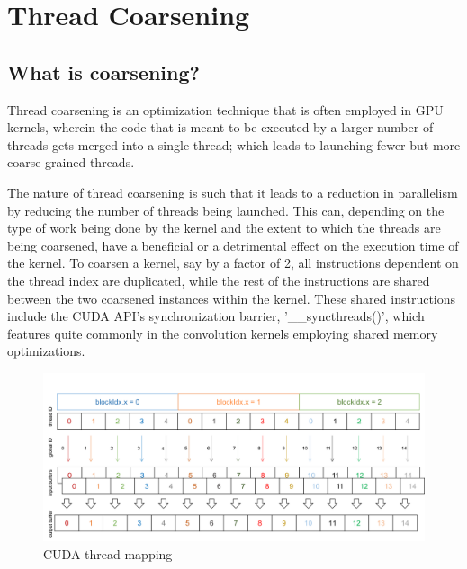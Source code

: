 
\chapter{Thread Coarsening} %

\label{Chapter3} %


\section{What is coarsening?} \label{sec:what_is_coarsening}
Thread coarsening is an optimization technique that is often employed in GPU kernels, wherein the code that is meant to be executed by a larger number of threads gets merged into a single thread; which leads to launching fewer but more coarse-grained threads.

The nature of thread coarsening is such that it leads to a reduction in parallelism by reducing the number of threads being launched. This can, depending on the type of work being done by the kernel and the extent to which the threads are being coarsened, have a beneficial or a detrimental effect on the execution time of the kernel. To coarsen a kernel, say by a factor of 2, all instructions dependent on the thread index are duplicated, while the rest of the instructions are shared between the two coarsened instances within the kernel. These shared instructions include the CUDA API's synchronization barrier, '\_\_syncthreads()', which features quite commonly in the convolution kernels employing shared memory optimizations.

\begin{figure}[ht]
	\centering
	\includegraphics[scale=0.25]{Pictures/ch3/thread_allocation.png}
	\caption{\small CUDA thread mapping}
\end{figure}



